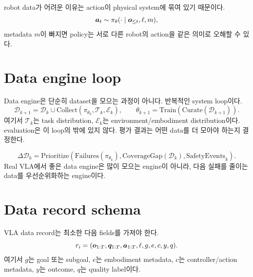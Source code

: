 robot data가 어려운 이유는 action이 physical system에 묶여 있기 때문이다.
\begin{equation}
  \bm{a}_t
  \sim
  \pi_{\theta}
  (\cdot \mid \bm{o}_{\leq t},\ell,m),
  \label{eq:ch14-policy-with-metadata}
\end{equation}
metadata $m$이 빠지면 policy는 서로 다른 robot의 action을 같은 의미로 오해할 수 있다.

\section{Data engine loop}

Data engine은 단순히 dataset을 모으는 과정이 아니다. 반복적인 system loop이다.
\begin{equation}
  \mathcal{D}_{k+1}
  =
  \mathcal{D}_{k}
  \cup
  \mathrm{Collect}
  (
  \pi_{\theta_k},
  \mathcal{T}_{k},
  \mathcal{E}_{k}
  ),
  \qquad
  \theta_{k+1}
  =
  \mathrm{Train}(\mathrm{Curate}(\mathcal{D}_{k+1})).
  \label{eq:ch14-data-loop}
\end{equation}
여기서 $\mathcal{T}_{k}$는 task distribution, $\mathcal{E}_{k}$는 environment/embodiment distribution이다. evaluation은 이 loop의 밖에 있지 않다. 평가 결과는 어떤 data를 더 모아야 하는지 결정한다.

\begin{equation}
  \Delta\mathcal{D}_{k}
  =
  \mathrm{Prioritize}
  (
  \mathrm{Failures}(\pi_{\theta_k}),
  \mathrm{CoverageGap}(\mathcal{D}_k),
  \mathrm{SafetyEvents}_k
  ).
  \label{eq:ch14-data-prioritize}
\end{equation}
Real VLA에서 좋은 data engine은 많이 모으는 engine이 아니라, 다음 실패를 줄이는 data를 우선순위화하는 engine이다.

\section{Data record schema}

VLA data record는 최소한 다음 fields를 가져야 한다.
\begin{equation}
  r_i
  =
  (
  \bm{o}_{1:T},
  \bm{q}_{1:T},
  \bm{a}_{1:T},
  \ell,
  g,
  e,
  c,
  y,
  q
  ).
  \label{eq:ch14-record-schema}
\end{equation}
여기서 $g$는 goal 또는 subgoal, $e$는 embodiment metadata, $c$는 controller/action metadata, $y$는 outcome, $q$는 quality label이다.

